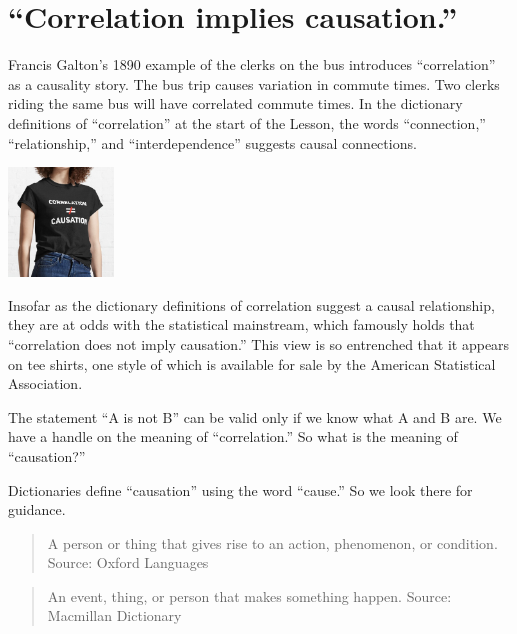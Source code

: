 \documentclass[
  letterpaper,
  DIV=11,
  numbers=noendperiod,
  oneside]{scrreprt}
\begin{document}
\hypertarget{correlation-implies-causation.}{%
\section{``Correlation implies
causation.''}\label{correlation-implies-causation.}}

Francis Galton's 1890 example of the clerks on the bus introduces
``correlation'' as a causality story. The bus trip causes variation in
commute times. Two clerks riding the same bus will have correlated
commute times. In the dictionary definitions of ``correlation'' at the
start of the Lesson, the words ``connection,'' ``relationship,'' and
``interdependence'' suggests causal connections.

\begin{marginfigure}

{\centering \includegraphics[width=1.1in,height=\textheight]{./www/correlation-tee-shirt.png}

}

\end{marginfigure}

Insofar as the dictionary definitions of correlation suggest a causal
relationship, they are at odds with the statistical mainstream, which
famously holds that ``correlation does not imply causation.'' This view
is so entrenched that it appears on tee shirts, one style of which is
available for sale by the American Statistical Association.

The statement ``A is not B'' can be valid only if we know what A and B
are. We have a handle on the meaning of ``correlation.'' So what is the
meaning of ``causation?''

Dictionaries define ``causation'' using the word ``cause.'' So we look
there for guidance.

\begin{quote}
A person or thing that gives rise to an action, phenomenon, or
condition. Source: Oxford Languages
\end{quote}

\begin{quote}
An event, thing, or person that makes something happen. Source:
Macmillan Dictionary
\end{quote}
\end{document}
